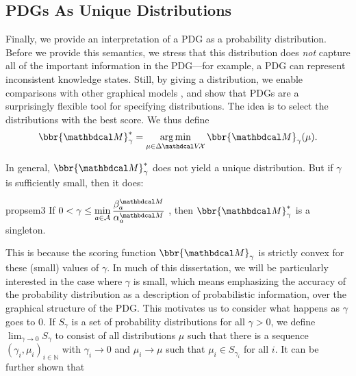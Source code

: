 
% 
%           
        


\subsection{PDGs As Unique Distributions}\label{sec:uniq-dist-semantics}

Finally, we provide an interpretation of a PDG as a probability distribution.
Before we provide this semantics, we stress that this distribution does
\emph{not} capture all of the important information in the PDG---for example, a
PDG can represent inconsistent knowledge states.  Still, by giving a
distribution, we enable comparisons with other graphical models%
, and show that PDGs are
a surprisingly flexible tool for specifying distributions.  
The idea is to select the distributions with the best score. 
We thus define 
\begin{equation}
	\bbr{\dg M}_\gamma^* = \argmin_{\mu \in \Delta\V\!\X} \bbr{\dg M}_\gamma(\mu).
\end{equation}   

In general, $\bbr{\dg M}_\gamma^*$ does not yield a unique distribution.  But if
$\gamma$ is sufficiently small, then it does:

\begin{linked}{prop}{sem3}
	If $0 < \gamma \leq 
        {\displaystyle \min_{a \in \Ar} \frac {\beta_a^{\dg M}}{\alpha_a^{\dg M}} }$
    \unskip, then $\bbr{\dg M}_\gamma^*$ is a singleton. 
\end{linked}

This is because the scoring function $\bbr{\dg M}_\gamma$ is 
strictly convex for these (small) values of $\gamma$. 
%
In much of this dissertation, we will be
    particularly interested in the case where $\gamma$ is small,
    which means emphasizing the accuracy of the probability
    distribution as a description of probabilistic information,
    over the graphical structure of the PDG.  
This motivates us to consider
what happens as $\gamma$ goes to 0. If $S_\gamma$ is a set of
probability distributions for all $\gamma > 0$,
we define $\lim_{\gamma \rightarrow 0} S_\gamma$ to consist of all distributions $\mu$ such that there
is a sequence $(\gamma_i, \mu_i)_{i \in \mathbb N}$ with $\gamma_i \to 0$ and
$\mu_i \to \mu$ such that $\mu_i \in S_{\gamma_i}$ for all $i$. 
It can be further shown that 

